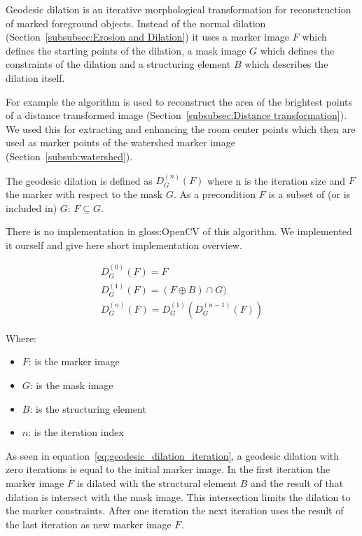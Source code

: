 Geodesic dilation is an iterative morphological transformation for reconstruction of marked foreground objects. Instead of the normal dilation (Section~\ref{subsubsec:Erosion and Dilation}) it uses a marker image $F$ which defines the starting points of the dilation, a mask image $G$ which defines the constraints of the dilation and a structuring element $B$ which describes the dilation itself.

For example the algorithm is used to reconstruct the area of the brightest points of a distance transformed image (Section~\ref{subsubsec:Distance transformation}). We used this for extracting and enhancing the room center points which then are used as marker points of the watershed marker image (Section~\ref{subsub:watershed}).

The geodesic dilation is defined as $D_{G}^{(n)}(F)$ where n is the iteration size and $F$ the marker with respect to the mask $G$. As a precondition $F$ is a subset of (or is included in) $G$: $F \subseteq G$.

There is no implementation in \gls{gloss:OpenCV} of this algorithm. We implemented it ourself and give here short implementation overview.
	
\begin{equation} \label{eq:geodesic_dilation_iteration}
\begin{gathered}
D_{G}^{(0)}(F) = F
\\
D_{G}^{(1)}(F) = (F \oplus B) \cap G)
\\
D_{G}^{(n)}(F) = D_{G}^{(1)}(D_{G}^{(n-1)}(F))
\end{gathered}
\end{equation}

Where:
\begin{itemize}[label=]
    \item $F$: is the marker image
    \item $G$: is the mask image
    \item $B$: is the structuring element
    \item $n$: is the iteration index
\end{itemize}

As seen in equation~\ref{eq:geodesic_dilation_iteration}, a geodesic dilation with zero iterations is equal to the initial marker image. In the first iteration the marker image $F$ is dilated with the structural element $B$ and the result of that dilation is intersect with the mask image. This intersection limits the dilation to the marker constraints. After one iteration the next iteration uses the result of the last iteration as new marker image $F$.

